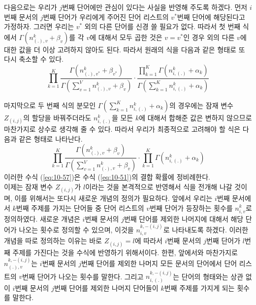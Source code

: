 \documentclass[a4paper]{oblivoir}
\begin{document}
다음으로는 우리가 $j$번째 단어에만 관심이 있다는 사실을 반영해 주도록 하겠다. 먼저 $i$번째 문서의 $j$번째 단어가 우리에게 주어진 단어 리스트의 $v^{*}$번째 단어에 해당된다고 가정하자. 그러면 우리는 $v^{*}$ 외의 다른 단어를 신경 쓸 필요가 없다. 따라서 첫 번째 식에서 $\Gamma(n_{(.),v}^{k}+\beta_{v})$를 각 $v$에 대해서 모두 곱한 것은 $v=v^{*}$인 경우 외의 다른 $v$에 대한 값을 더 이상 고려하지 않아도 된다. 따라서 원래의 식을 다음과 같은 형태로 또 다시 축소할 수 있다. 
\begin{equation}
\prod_{k=1}^{K} \frac{\Gamma(n_{(.),v^{*}}^{k}+\beta_{v^{*}})}{\Gamma(\sum_{v=1}^{V} n_{(.),v}^{k}+\beta_{v})} \cdot \frac{\prod_{k=1}^{K} \Gamma(n^{k}_{i,(.)}+\alpha_{k})}{\Gamma(\sum_{k=1}^{K} n^{k}_{i,(.)}+\alpha_{k})}
\label{eq:10-56}
\end{equation}

마지막으로 두 번째 식의 분모인 $\Gamma(\sum_{k=1}^{K} n^{k}_{i,(.)}+\alpha_{k})$의 경우에는 잠재 변수 $Z_{(i,j)}$의 할당을 바꿔주더라도 $n^{k}_{i,(.)}$을 모든 $k$에 대해서 합해준 값은 변하지 않으므로 마찬가지로 상수로 생각해 줄 수 있다. 따라서 우리가 최종적으로 고려해야 할 식은 다음과 같은 형태로 나타난다. 
\begin{equation}
\prod_{k=1}^{K} \frac{\Gamma(n_{(.),v}^{k}+\beta_{v})}{\Gamma(\sum_{v=1}^{V} n_{(.),v}^{k}+\beta_{v})} \cdot \prod_{k=1}^{K} \Gamma(n^{k}_{i,(.)}+\alpha_{k})
\label{eq:10-57}
\end{equation}
이러한 수식 (\ref{eq:10-57})은 수식 (\ref{eq:10-51})의 결합 확률에 정비례한다. \\

이제는 잠재 변수 $Z_{(i,j)}$가 $l$이라는 것을 본격적으로 반영해서 식을 전개해 나갈 것이며, 이를 위해서는 또다시 새로운 개념의 정의가 필요하다. 앞에서 우리는 $i$번째 문서에서 $k$번째 주제를 가지는 단어들 중 단어 리스트의 $v$번째 단어가 등장하는 횟수를 $n_{i,v}^{k}$로 정의하였다. 새로운 개념은 $i$번째 문서의 $j$번째 단어를 제외한 나머지에 대해서 해당 단어가 나오는 횟수로 정의할 수 있으며, 이것을 $n_{i,v}^{k,-(i,j)}$로 나타내도록 하겠다. 이러한 개념을 따로 정의하는 이유는 바로 $Z_{(i,j)} = l$에 따라서 $i$번째 문서의 $j$번째 단어가 $l$번째 주제를 가진다는 것을 수식에 반영하기 위해서이다. 한편, 앞에서와 마찬가지로 $n_{(.),v}^{k,-(i,j)}$는 $i$번째 문서의 $j$번째 단어를 제외한 나머지 모든 문서의 단어에서 단어 리스트의 $v$번째 단어가 나오는 횟수를 말한다. 그리고 $n_{i,(.)}^{k,-(i,j)}$는 단어의 형태와는 상관 없이 $i$번째 문서의 $j$번째 단어를 제외한 나머지 단어들이 $k$번째 주제를 가지게 되는 횟수를 말한다. \\
\end{document}
